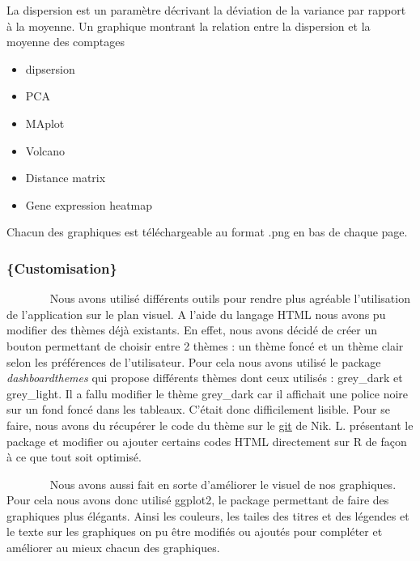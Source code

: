 \documentclass[
  12pt,
]{article}
\begin{document}
\normalsize
{}

La dispersion est un paramètre décrivant la déviation de la variance par
rapport à la moyenne. Un graphique montrant la relation entre la
dispersion et la moyenne des comptages

\begin{itemize}
\item
  dipsersion
\item
  PCA
\item
  MAplot
\item
  Volcano
\item
  Distance matrix
\item
  Gene expression heatmap
\end{itemize}

Chacun des graphiques est téléchargeable au format .png en bas de chaque
page.

\hypertarget{customisation}{%
\subsubsection{\texorpdfstring{\normalsize\{Customisation\}}{\{Customisation\}}}\label{customisation}}

~~~~~~~ Nous avons utilisé différents outils pour rendre plus agréable
l'utilisation de l'application sur le plan visuel. A l'aide du langage
HTML nous avons pu modifier des thèmes déjà existants. En effet, nous
avons décidé de créer un bouton permettant de choisir entre 2 thèmes :
un thème foncé et un thème clair selon les préférences de l'utilisateur.
Pour cela nous avons utilisé le package \emph{dashboardthemes} qui
propose différents thèmes dont ceux utilisés : grey\_dark et
grey\_light. Il a fallu modifier le thème grey\_dark car il affichait
une police noire sur un fond foncé dans les tableaux. C'était donc
difficilement lisible. Pour se faire, nous avons du récupérer le code du
thème sur le
\href{https://github.com/nik01010/dashboardthemes}{\underline{git}} de
Nik. L. présentant le package et modifier ou ajouter certains codes HTML
directement sur R de façon à ce que tout soit optimisé.

\par

~~~~~~~ Nous avons aussi fait en sorte d'améliorer le visuel de nos
graphiques. Pour cela nous avons donc utilisé ggplot2, le package
permettant de faire des graphiques plus élégants. Ainsi les couleurs,
les tailes des titres et des légendes et le texte sur les graphiques on
pu être modifiés ou ajoutés pour compléter et améliorer au mieux chacun
des graphiques.
\end{document}
